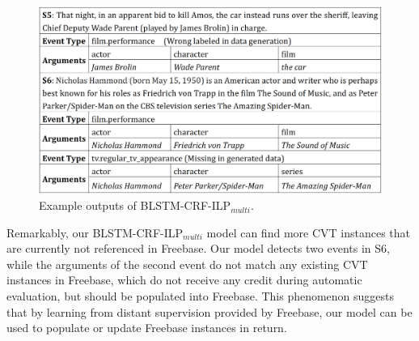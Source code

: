 \begin{figure}[h]
	\centering
	\includegraphics[width=.48\textwidth]{figure3.png}
	\caption{Example outputs of BLSTM-CRF-ILP$_{multi}$.\label{fig:1}}
\end{figure}




Remarkably, our BLSTM-CRF-ILP$_{multi}$ model can find more CVT instances that are currently not referenced in Freebase. Our model detects two events in S6, while the arguments of the second event do not match any existing CVT instances in Freebase, which do not receive any credit during automatic evaluation, but should be populated into Freebase. %
This phenomenon suggests that by learning from distant supervision provided by Freebase, our model can be used to populate or update Freebase instances in return.

